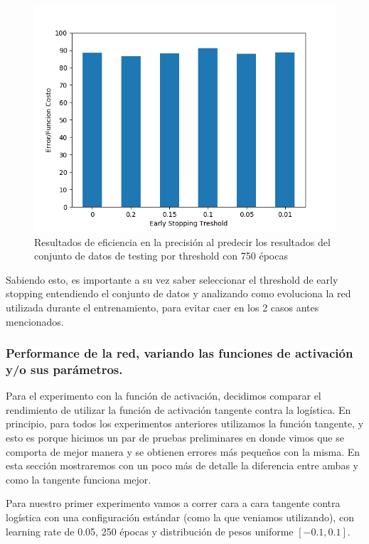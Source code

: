\begin{figure}[!htbp]
  \begin{center}
  \includegraphics[scale=0.60]{graficos/early_stopping_testing_750ep.png}
  \caption{Resultados de eficiencia en la precisión al predecir los resultados del conjunto de datos de testing por threshold con 750 épocas}
  \end{center}
\end{figure}

Sabiendo esto, es importante a su vez saber seleccionar el threshold de early stopping entendiendo el conjunto de datos y analizando como evoluciona la 
red utilizada durante el entrenamiento, para evitar caer en los 2 casos antes mencionados. 

\subsubsection{Performance de la red, variando las funciones de activación y/o sus parámetros.}

Para el experimento con la función de activación, decidimos comparar el rendimiento de utilizar la función de activación tangente contra la logística. 
En principio, para todos los experimentos anteriores utilizamos la función tangente, y esto es porque hicimos un par de pruebas preliminares en donde 
vimos que se comporta de mejor manera y se obtienen errores más pequeños con la misma. En esta sección mostraremos con un poco más de detalle la diferencia 
entre ambas y como la tangente funciona mejor.

Para nuestro primer experimento vamos a correr cara a cara tangente contra logística con una configuración estándar (como la que veniamos utilizando), con 
learning rate de 0.05, 250 épocas y distribución de pesos uniforme $[-0.1, 0.1]$.

